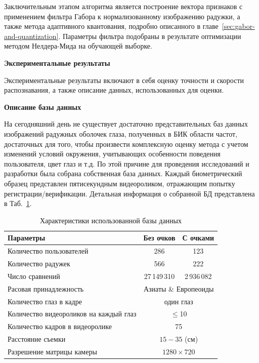 Заключительным этапом алгоритма является построение вектора признаков с применением фильтра Габора к нормализованному изображению радужки, а также метода адаптивного квантования, подробно описанного в главе~\ref{sec:gabor-and-quantization}. Параметры фильтра подобраны в результате оптимизации методом Нелдера-Мида на обучающей выборке.

{\bf Экспериментальные результаты}

Экспериментальные результаты включают в себя оценку точности и скорости распознавания, а также описание данных, использованных для оценки.

{\bf Описание базы данных}

На сегодняшний день не существует достаточно представительных баз данных изображений радужных оболочек глаза, полученных в БИК области частот, достаточных для того, чтобы произвести комплексную оценку метода с учетом изменений условий окружения, учитывающих особенности поведения пользователя, цвет глаз и т.д. По этой причине для проведения исследований и разработки была собрана собственная база данных. Каждый биометрический образец представлен пятисекундным видеороликом, отражающим попытку регистрации/верификации. Детальная информация о собранной БД представлена в Таб.~\ref{tab:dataset_spec}.

\begin{table}[h]
	\begin{center}
		\small
		\begin{tabular}{l|c|c}
			\hline
			Параметры										& Без очков		  & С очками \\
			\hline
			Количество пользователей						& 286             & 123 \\
			Количество радужек								& 566             & 222 \\
			Число сравнений									& 27\,149\,310    & 2\,936\,082 \\
			Расовая принадлежность							&  \multicolumn{2}{c}{Азиаты \& Европеоиды} \\
			Количество глаз в кадре							&  \multicolumn{2}{c}{один глаз} \\
			Количество видеороликов на каждый глаз			&  \multicolumn{2}{c}{$\leq$10} \\
			Количество кадров в видеоролике					&  \multicolumn{2}{c}{75} \\
			Расстояние съемки								&  \multicolumn{2}{c}{$15 - 35$ (см)} \\
			Разрешение матрицы камеры       				&  \multicolumn{2}{c}{$1280 \times 720$} \\
			\hline
		\end{tabular}
	\end{center}
	\caption{Характеристики использованной базы данных}
	\label{tab:dataset_spec}
\end{table}


